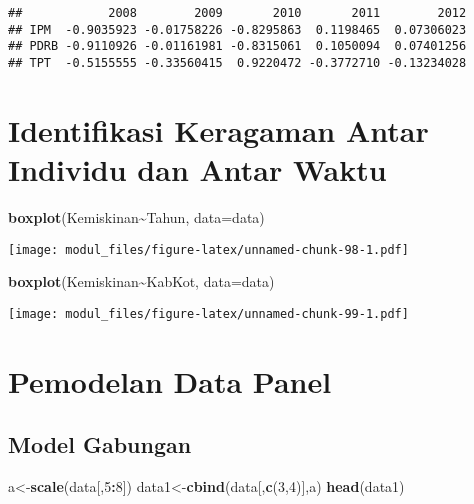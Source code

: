 \documentclass[
]{book}
\newenvironment{Shaded}{\begin{snugshade}}{\end{snugshade}}
\newcommand{\DataTypeTok}[1]{\textcolor[rgb]{0.13,0.29,0.53}{#1}}
\newcommand{\DecValTok}[1]{\textcolor[rgb]{0.00,0.00,0.81}{#1}}
\newcommand{\KeywordTok}[1]{\textcolor[rgb]{0.13,0.29,0.53}{\textbf{#1}}}
\newcommand{\NormalTok}[1]{#1}
\newcommand{\OperatorTok}[1]{\textcolor[rgb]{0.81,0.36,0.00}{\textbf{#1}}}
\begin{document}
\begin{verbatim}
##            2008        2009       2010       2011        2012
## IPM  -0.9035923 -0.01758226 -0.8295863  0.1198465  0.07306023
## PDRB -0.9110926 -0.01161981 -0.8315061  0.1050094  0.07401256
## TPT  -0.5155555 -0.33560415  0.9220472 -0.3772710 -0.13234028
\end{verbatim}

\hypertarget{identifikasi-keragaman-antar-individu-dan-antar-waktu}{%
\section{Identifikasi Keragaman Antar Individu dan Antar Waktu}\label{identifikasi-keragaman-antar-individu-dan-antar-waktu}}

\begin{Shaded}
\begin{Highlighting}[]
\KeywordTok{boxplot}\NormalTok{(Kemiskinan}\OperatorTok{\textasciitilde{}}\NormalTok{Tahun, }\DataTypeTok{data=}\NormalTok{data)}
\end{Highlighting}
\end{Shaded}

\texttt{[image: modul\_files/figure-latex/unnamed-chunk-98-1.pdf]}

\begin{Shaded}
\begin{Highlighting}[]
\KeywordTok{boxplot}\NormalTok{(Kemiskinan}\OperatorTok{\textasciitilde{}}\NormalTok{KabKot, }\DataTypeTok{data=}\NormalTok{data)}
\end{Highlighting}
\end{Shaded}

\texttt{[image: modul\_files/figure-latex/unnamed-chunk-99-1.pdf]}

\hypertarget{pemodelan-data-panel}{%
\section{Pemodelan Data Panel}\label{pemodelan-data-panel}}

\hypertarget{model-gabungan}{%
\subsection{Model Gabungan}\label{model-gabungan}}

\begin{Shaded}
\begin{Highlighting}[]
\NormalTok{a\textless{}{-}}\KeywordTok{scale}\NormalTok{(data[,}\DecValTok{5}\OperatorTok{:}\DecValTok{8}\NormalTok{]) }
\NormalTok{data1\textless{}{-}}\KeywordTok{cbind}\NormalTok{(data[,}\KeywordTok{c}\NormalTok{(}\DecValTok{3}\NormalTok{,}\DecValTok{4}\NormalTok{)],a)}
\KeywordTok{head}\NormalTok{(data1)}
\end{Highlighting}
\end{Shaded}
\end{document}
